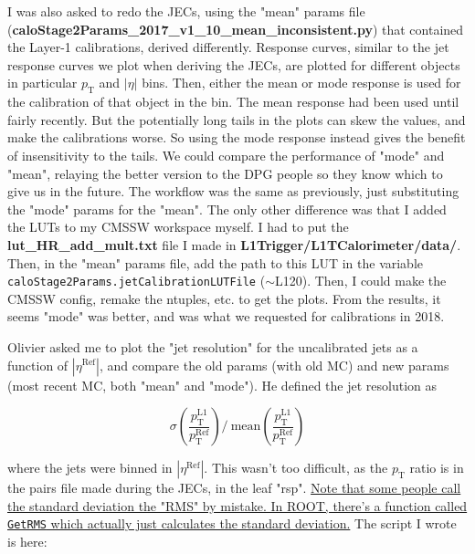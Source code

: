 I was also asked to redo the JECs, using the "mean" params file (\textbf{caloStage2Params\_2017\_v1\_10\_mean\_inconsistent.py}) that contained the Layer-1 calibrations, derived differently. Response curves, similar to the jet response curves we plot when deriving the JECs, are plotted for different objects in particular $p_{\mathrm{T}}$ and $|\eta|$ bins. Then, either the mean or mode response is used for the calibration of that object in the bin. The mean response had been used until fairly recently. But the potentially long tails in the plots can skew the values, and make the calibrations worse. So using the mode response instead gives the benefit of insensitivity to the tails. We could compare the performance of "mode" and "mean", relaying the better version to the DPG people so they know which to give us in the future. The workflow was the same as previously, just substituting the "mode" params for the "mean". The only other difference was that I added the LUTs to my CMSSW workspace myself. I had to put the \textbf{lut\_HR\_add\_mult.txt} file I made in \textbf{L1Trigger/L1TCalorimeter/data/}. Then, in the "mean" params file, add the path to this LUT in the variable \texttt{caloStage2Params.jetCalibrationLUTFile} ($\sim$L120). Then, I could make the CMSSW config, remake the ntuples, etc. to get the plots. From the results, it seems "mode" was better, and was what we requested for calibrations in 2018.

Olivier asked me to plot the "jet resolution" for the uncalibrated jets as a function of $|\eta^{\mathrm{Ref}}|$, and compare the old params (with old MC) and new params (most recent MC, both "mean" and "mode"). He defined the jet resolution as

\begin{equation}
\sigma\left( \frac{ p_{\mathrm{T}}^{\mathrm{L1}} }{ p_{\mathrm{T}}^{\mathrm{Ref}} } \right) /  \ \textrm{mean} \left( \frac{ p_{\mathrm{T}}^{\mathrm{L1}} }{ p_{\mathrm{T}}^{\mathrm{Ref}} } \right)
\end{equation}

where the jets were binned in $|\eta^{\mathrm{Ref}}|$. This wasn't too difficult, as the $p_{\mathrm{T}}$ ratio is in the pairs file made during the JECs, in the leaf "rsp". \uline{Note that some people call the standard deviation the "RMS" by mistake. In ROOT, there's a function called \texttt{GetRMS} which actually just calculates the standard deviation.} The script I wrote is here:



